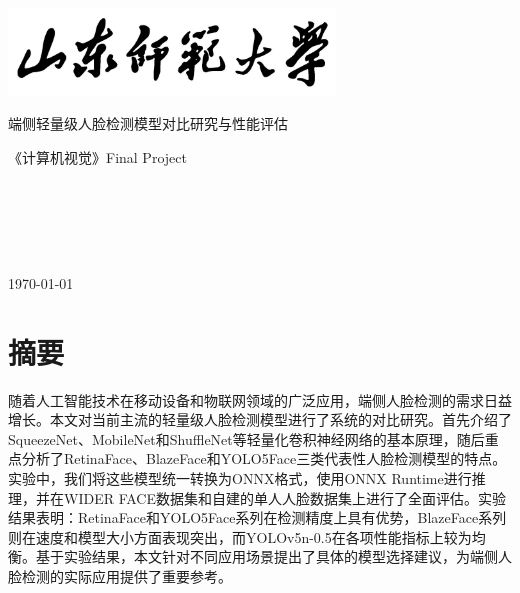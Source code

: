 \documentclass{article}
\begin{document}
\setcounter{page}{0}

\begin{titlepage}
    \centering
    \includegraphics[width=0.65\textwidth]{./imgs/logo_text.png}
    \par\vspace{1.5cm}
    {\Huge \heiti 端侧轻量级人脸检测模型对比研究与性能评估 \par}
    \vspace{1cm}
    {\Large \heiti 《计算机视觉》Final Project \par}
    \vspace{5cm}

    \begin{center}
        {\Large
        \underline{}\\
        \underline{}\\
        \underline{}\\
        \underline{}\\
        }
    \end{center}

    \vfill
    {\Large \today} %
\end{titlepage}
\setcounter{page}{1}    %
\thispagestyle{empty}   %

\sectionfont{\centering}
\clearpage
\newpage

\setcounter{page}{1}
\section*{摘要}
随着人工智能技术在移动设备和物联网领域的广泛应用，端侧人脸检测的需求日益增长。本文对当前主流的轻量级人脸检测模型进行了系统的对比研究。首先介绍了SqueezeNet、MobileNet和ShuffleNet等轻量化卷积神经网络的基本原理，随后重点分析了RetinaFace、BlazeFace和YOLO5Face三类代表性人脸检测模型的特点。实验中，我们将这些模型统一转换为ONNX格式，使用ONNX Runtime进行推理，并在WIDER FACE数据集和自建的单人人脸数据集上进行了全面评估。实验结果表明：RetinaFace和YOLO5Face系列在检测精度上具有优势，BlazeFace系列则在速度和模型大小方面表现突出，而YOLOv5n-0.5在各项性能指标上较为均衡。基于实验结果，本文针对不同应用场景提出了具体的模型选择建议，为端侧人脸检测的实际应用提供了重要参考。
\end{document}
